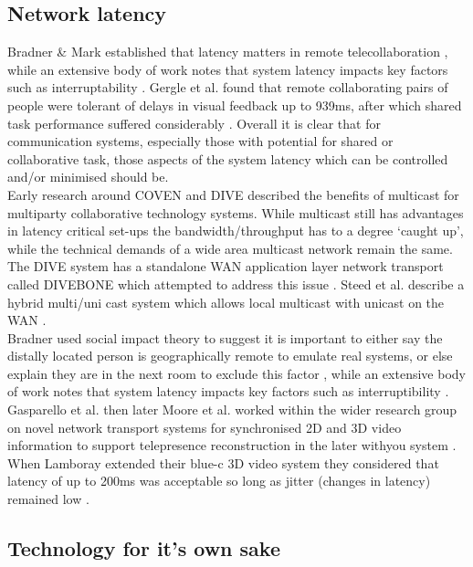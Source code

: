               \subsection{Network latency}
            Bradner \& Mark established that latency matters in remote telecollaboration \cite{Bradner:2002:WDM:587078.587110}, while an extensive body of work notes that system latency impacts key factors such as interruptability \cite{Avrahami2007}. Gergle et al. found that remote collaborating pairs of people were tolerant of delays in visual feedback up to 939ms, after which shared task performance suffered considerably \cite{Gergle2006}. Overall it is clear that for communication systems, especially those with potential for shared or collaborative task, those aspects of the system latency which can be controlled and/or minimised should be.\\
             Early research around COVEN and DIVE described the benefits of multicast for multiparty collaborative technology systems. While multicast still has advantages in latency critical set-ups the bandwidth/throughput has to a degree `caught up', while the technical demands of a wide area multicast network remain the same. The DIVE system has a standalone WAN application layer network transport called DIVEBONE which attempted to address this issue \cite{Greenhalgh2001a}. Steed et al. describe a hybrid multi/uni cast system which allows local multicast with unicast on the WAN \cite{Greenhalgh2001}.\\
              Bradner used social impact theory to suggest  it is important to either say the distally located person is geographically remote to emulate real systems, or else explain they are in the next room to exclude this factor \cite{Bradner:2002:WDM:587078.587110}, while an extensive body of work notes that system latency impacts key factors such as interruptibility \cite{Avrahami2007}.\\
         Gasparello et al. \cite{Gasparello:2011in} then later Moore et al. \cite{Moore:2010jt} worked within the wider research group on novel network transport systems for synchronised 2D and 3D video information to support telepresence reconstruction in the later withyou system \cite{Roberts2015}. \\
       When Lamboray extended their blue-c 3D video system they considered that latency of up to 200ms was acceptable so long as jitter (changes in latency) remained low \cite{Park1999, lamboray2005data}.
       \subsection{Technology for it's own sake}
   